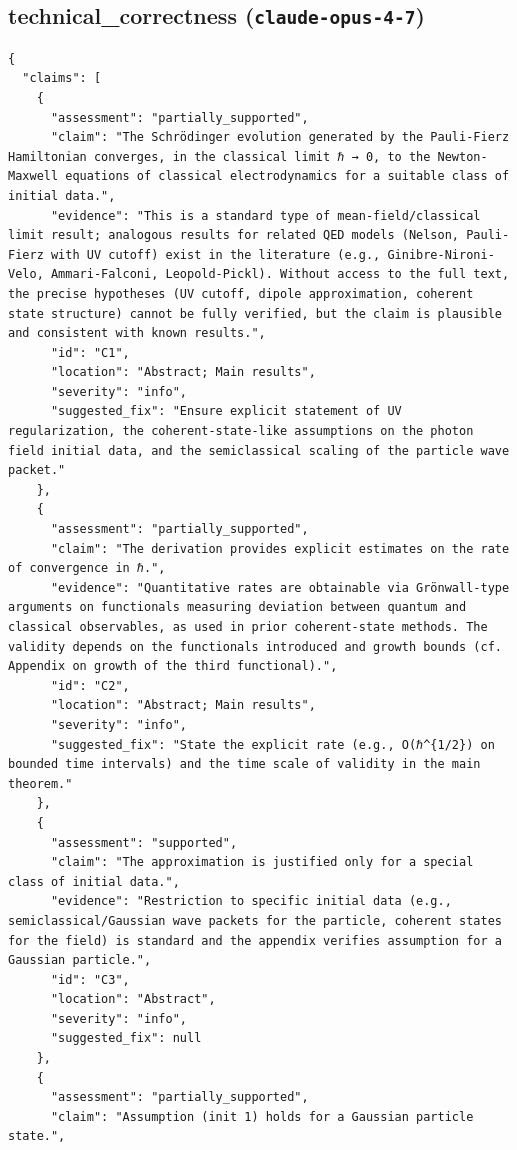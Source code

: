 \documentclass[11pt]{article}
\begin{document}
\subsection*{technical_correctness (\texttt{claude-opus-4-7})}
\begin{verbatim}
{
  "claims": [
    {
      "assessment": "partially_supported",
      "claim": "The Schrödinger evolution generated by the Pauli-Fierz Hamiltonian converges, in the classical limit ℏ → 0, to the Newton-Maxwell equations of classical electrodynamics for a suitable class of initial data.",
      "evidence": "This is a standard type of mean-field/classical limit result; analogous results for related QED models (Nelson, Pauli-Fierz with UV cutoff) exist in the literature (e.g., Ginibre-Nironi-Velo, Ammari-Falconi, Leopold-Pickl). Without access to the full text, the precise hypotheses (UV cutoff, dipole approximation, coherent state structure) cannot be fully verified, but the claim is plausible and consistent with known results.",
      "id": "C1",
      "location": "Abstract; Main results",
      "severity": "info",
      "suggested_fix": "Ensure explicit statement of UV regularization, the coherent-state-like assumptions on the photon field initial data, and the semiclassical scaling of the particle wave packet."
    },
    {
      "assessment": "partially_supported",
      "claim": "The derivation provides explicit estimates on the rate of convergence in ℏ.",
      "evidence": "Quantitative rates are obtainable via Grönwall-type arguments on functionals measuring deviation between quantum and classical observables, as used in prior coherent-state methods. The validity depends on the functionals introduced and growth bounds (cf. Appendix on growth of the third functional).",
      "id": "C2",
      "location": "Abstract; Main results",
      "severity": "info",
      "suggested_fix": "State the explicit rate (e.g., O(ℏ^{1/2}) on bounded time intervals) and the time scale of validity in the main theorem."
    },
    {
      "assessment": "supported",
      "claim": "The approximation is justified only for a special class of initial data.",
      "evidence": "Restriction to specific initial data (e.g., semiclassical/Gaussian wave packets for the particle, coherent states for the field) is standard and the appendix verifies assumption for a Gaussian particle.",
      "id": "C3",
      "location": "Abstract",
      "severity": "info",
      "suggested_fix": null
    },
    {
      "assessment": "partially_supported",
      "claim": "Assumption (init 1) holds for a Gaussian particle state.",

\end{verbatim}
\end{document}
